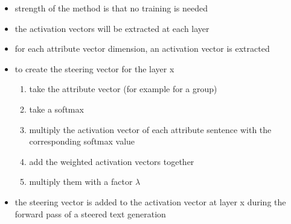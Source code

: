 \label{sec:approach:steering:activation}
\begin{itemize}
  \item strength of the method is that no training is needed
  \item the activation vectors will be extracted at each layer
  \item for each attribute vector dimension, an activation vector is extracted
  \item to create the steering vector for the layer x
        \begin{enumerate}
          \item take the attribute vector (for example for a group)
          \item take a softmax
          \item multiply the activation vector of each attribute sentence with the corresponding softmax value
          \item add the weighted activation vectors together
          \item multiply them with a factor \(\lambda\)
        \end{enumerate}
  \item the steering vector is added to the activation vector at layer x during the forward pass of a steered text generation
\end{itemize}